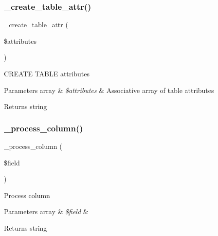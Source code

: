 \subsubsection{\texorpdfstring{\+\_\+create\+\_\+table\+\_\+attr()}{\_create\_table\_attr()}}
{\footnotesize\ttfamily \+\_\+create\+\_\+table\+\_\+attr (\begin{DoxyParamCaption}\item[{}]{\$attributes }\end{DoxyParamCaption})\hspace{0.3cm}{\ttfamily [protected]}}

C\+R\+E\+A\+TE T\+A\+B\+LE attributes


\begin{DoxyParams}[1]{Parameters}
array & {\em \$attributes} & Associative array of table attributes \\
\hline
\end{DoxyParams}
\begin{DoxyReturn}{Returns}
string 
\end{DoxyReturn}
\mbox{\label{class_c_i___d_b__mysqli__forge_a8f38f1c5b5dddecca4befbe393f3f299}} 
\subsubsection{\texorpdfstring{\+\_\+process\+\_\+column()}{\_process\_column()}}
{\footnotesize\ttfamily \+\_\+process\+\_\+column (\begin{DoxyParamCaption}\item[{}]{\$field }\end{DoxyParamCaption})\hspace{0.3cm}{\ttfamily [protected]}}

Process column


\begin{DoxyParams}[1]{Parameters}
array & {\em \$field} & \\
\hline
\end{DoxyParams}
\begin{DoxyReturn}{Returns}
string 
\end{DoxyReturn}
\mbox{\label{class_c_i___d_b__mysqli__forge_ae0bdb4ea3418590d1894c5b621b5ca50}} 
